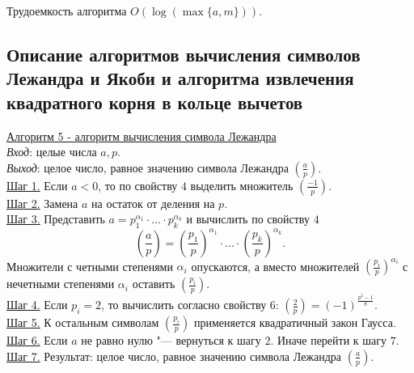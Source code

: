 \documentclass[bachelor, och, labwork]{shiza}
\begin{document}
            Трудоемкость алгоритма $O(\log(\max\{a, m\}))$.\\


    \subsection{Описание алгоритмов вычисления символов Лежандра и Якоби и
    алгоритма извлечения квадратного корня в кольце вычетов}

        \underline{Алгоритм 5 - алгоритм вычисления символа Лежандра}\\
            \textit{Вход}: целые числа $a, p$.\\
            \textit{Выход}: целое число, равное значению символа Лежандра
            $\left(\frac{a}{p}\right)$.\\
            \underline{Шаг 1.} Если $a < 0$, то по свойству $4$ выделить
            множитель $\left(\frac{-1}{p}\right)$.\\
            \underline{Шаг 2.} Замена $a$ на остаток от деления на $p$.\\
            \underline{Шаг 3.} Представить $a = p_1^{\alpha_1} \cdot \dots \cdot
            p_k^{\alpha_k}$ и вычислить по свойству $4$
            $$\left(\frac{a}{p}\right) = \left(\frac{p_1}{p}\right)^{\alpha_1}
            \cdot \dots \cdot \left(\frac{p_k}{p}\right)^{\alpha_k}.$$ Множители
            с четными степенями $\alpha_i$ опускаются, а вместо множителей
            $\left(\frac{p_i}{p}\right)^{\alpha_i}$ с нечетными степенями
            $\alpha_i$ оставить $\left(\frac{p_i}{p}\right)$.\\
            \underline{Шаг 4.} Если $p_i = 2$, то вычислить согласно свойству
            $6$: $\left(\frac{2}{p}\right) = (-1)^{\frac{p^2 - 1}{8}}$.\\
            \underline{Шаг 5.} К остальным символам $\left(\frac{p_i}{p}\right)$
            применяется квадратичный закон Гаусса.\\
            \underline{Шаг 6.} Если $a$ не равно нулю "--- вернуться к шагу
            $2$. Иначе перейти к шагу $7$.\\
            \underline{Шаг 7.} Результат: целое число, равное значению символа
            Лежандра $\left(\frac{a}{p}\right)$.\\
\end{document}
